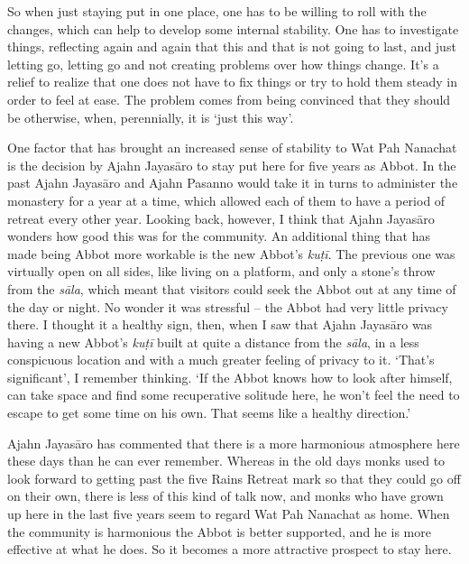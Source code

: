 So when just staying put in one place, one has to be willing to roll with
the changes, which can help to develop some internal stability. One has
to investigate things, reflecting again and again that this and that is
not going to last, and just letting go, letting go and not creating
problems over how things change. It's a relief to realize that one does
not have to fix things or try to hold them steady in order to feel at
ease. The problem comes from being convinced that they should be
otherwise, when, perennially, it is `just this way'. 

One factor that has brought an increased sense of stability to Wat Pah
Nanachat is the decision by Ajahn Jayasāro to stay put here for five
years as Abbot. In the past Ajahn Jayasāro and Ajahn Pasanno would take
it in turns to administer the monastery for a year at a time, which
allowed each of them to have a period of retreat every other year. 
Looking back, however, I think that Ajahn Jayasāro wonders how good this
was for the community. An additional thing that has made being Abbot
more workable is the new Abbot's \emph{kuṭī}. The previous one was
virtually open on all sides, like living on a platform, and only a
stone's throw from the \emph{sāla}, which meant that visitors could seek
the Abbot out at any time of the day or night. No wonder it was
stressful -- the Abbot had very little privacy there. I thought it a
healthy sign, then, when I saw that Ajahn Jayasāro was having a new
Abbot's \emph{kuṭī} built at quite a distance from the \emph{sāla}, in a
less conspicuous location and with a much greater feeling of privacy to
it. `That's significant', I remember thinking. `If the Abbot knows how
to look after himself, can take space and find some recuperative
solitude here, he won't feel the need to escape to get some time on his
own. That seems like a healthy direction.'

Ajahn Jayasāro has commented that there is a more harmonious atmosphere
here these days than he can ever remember. Whereas in the old days monks
used to look forward to getting past the five Rains Retreat mark so that
they could go off on their own, there is less of this kind of talk now, 
and monks who have grown up here in the last five years seem to regard
Wat Pah Nanachat as home. When the community is harmonious the Abbot is
better supported, and he is more effective at what he does. So it
becomes a more attractive prospect to stay here. 

